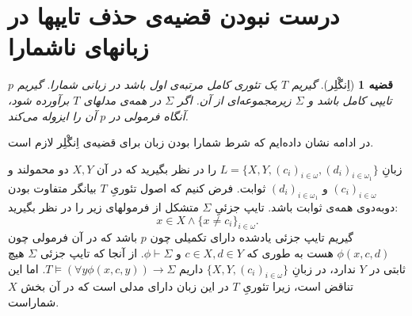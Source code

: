 \documentclass[12pt,a4paper]{report}
\theoremstyle{colorhead}
\newtheorem{thm}{قضیه}
\begin{document}
\section*{درست نبودن قضیه‌ی حذف تایپها در زبانهای ناشمارا}
\begin{thm}[اِنگْلِر]
گیریم 
$T$
یک تئوری کامل مرتبه‌ی اول باشد در زبانی شمارا. گیریم
$p$
تایپی کامل باشد و 
$\Sigma$
زیرمجموعه‌ای از آن. اگر
$\Sigma$
در همه‌ی مدلهای 
$T$
برآورده شود، آنگاه 
فرمولی در
$p$
آن را ایزوله می‌کند.
\end{thm}
در ادامه نشان داده‌ایم که شرط شمارا بودن زبان برای
قضیه‌ی اِنگْلِر لازم است.
\par 
زبانِ
$L=\{X,Y,(c_i)_{i\in \omega}, (d_i)_{i\in \omega_1}\}$
را در نظر بگیرید که در آن
$X,Y$
دو محمولند و 
$(c_i)_{i\in \omega}$
و
$(d_i)_{i\in \omega_1}$
ثوابت. 
فرض کنیم که اصول تئوریِ
$T$
بیانگر متفاوت بودن دوبه‌دوی همه‌ی ثوابت باشد. تایپ جزئیِ
$\Sigma$
متشکل از فرمولهای زیر را در نظر بگیرید:
\[
x\in X\wedge \{x\not=c_i\}_{i\in \omega}.
\]
گیریم تایپ جزئی یادشده 
دارای تکمیلی چون
$p$
باشد که در آن فرمولی چون
$\phi(x,c,d)$
هست به طوری که
$c\in X, d\in Y$
و
$\phi\vdash \Sigma$.
از آنجا که تایپ جزئی
$\Sigma$
هیچ ثابتی در
$Y$
ندارد، 
در زبانِ
$\{X,Y,(c_i)_{i\in \omega}\}$
داریم
$T\models (\forall y \phi(x,c,y))\to \Sigma$.
اما این تناقض است، زیرا تئوریِ
$T$
در این زبان دارای مدلی است که در آن
بخش
$X$
شماراست. 
\end{document}
